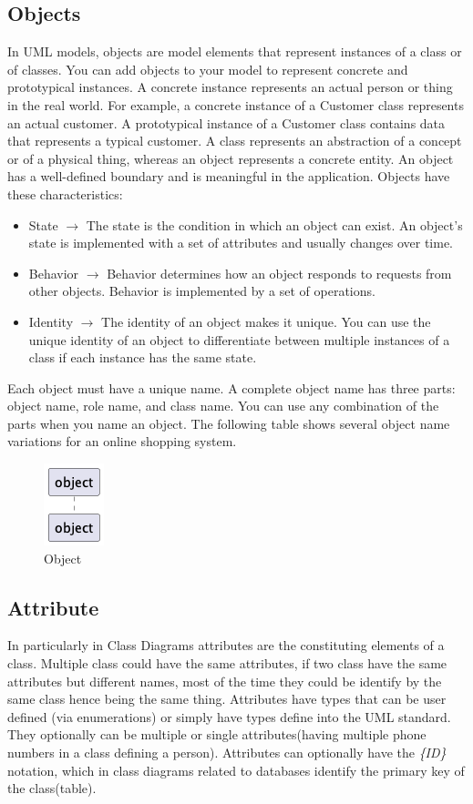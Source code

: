 \subsection{Objects}
In UML models, objects are model elements that represent instances of a class or of classes. You can add objects to your model to represent concrete and prototypical instances. A concrete instance represents an actual person or thing in the real world. For example, a concrete instance of a Customer class represents an actual customer. A prototypical instance of a Customer class contains data that represents a typical customer.
A class represents an abstraction of a concept or of a physical thing, whereas an object represents a concrete entity. An object has a well-defined boundary and is meaningful in the application. Objects have these characteristics:
\begin{itemize}
	\item State $\rightarrow$ The state is the condition in which an object can exist. An object’s state is implemented with a set of attributes and usually changes over time.
	\item Behavior $\rightarrow$ Behavior determines how an object responds to requests from other objects. Behavior is implemented by a set of operations.
	\item Identity $\rightarrow$ The identity of an object makes it unique. You can use the unique identity of an object to differentiate between multiple instances of a class if each instance has the same state.
\end{itemize}
Each object must have a unique name. A complete object name has three parts: object name, role name, and class name. You can use any combination of the parts when you name an object. The following table shows several object name variations for an online shopping system. 
\begin{figure}[hbt]
\label{object}
  \centering\includegraphics{Immagini/test-2.png}
  \caption{Object}
\end{figure}

\subsection{Attribute}
In particularly in Class Diagrams attributes are the constituting elements of a class. Multiple class could have the same attributes, if two class have the same attributes but different names, most of the time they could be identify by the same class hence being the same thing. Attributes have types that can be user defined (via enumerations) or simply have types define into the UML standard. They optionally can be multiple or single attributes(having multiple phone numbers in a class defining a person). Attributes can optionally have the \emph{\{ID\}} notation, which in class diagrams related to databases identify the primary key of the class(table).
